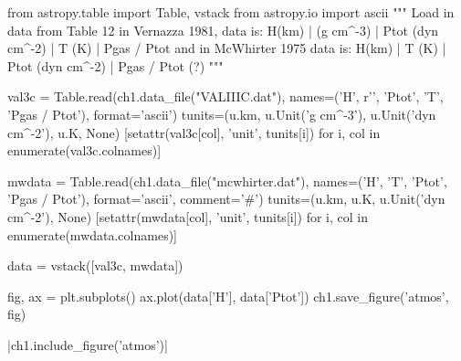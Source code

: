 \begin{pycode}[chapter1]
from astropy.table import Table, vstack
from astropy.io import ascii
"""
Load in data from Table 12 in Vernazza 1981,
data is:
    H(km) | \rho (g cm^-3) | Ptot (dyn cm^-2) | T (K) | Pgas / Ptot
and in McWhirter 1975 data is:  
    H(km) | T (K)          | Ptot (dyn cm^-2) | Pgas / Ptot (?)
"""

val3c = Table.read(ch1.data_file("VALIIIC.dat"),
				  names=('H', r'\rho', 'Ptot', 'T', 'Pgas / Ptot'),
				  format='ascii')
tunits=(u.km, u.Unit('g cm^-3'), u.Unit('dyn cm^-2'), u.K, None)
[setattr(val3c[col], 'unit', tunits[i]) for i, col in enumerate(val3c.colnames)]

mwdata = Table.read(ch1.data_file("mcwhirter.dat"),
				  names=('H', 'T', 'Ptot', 'Pgas / Ptot'),
				  format='ascii', comment='#')
tunits=(u.km, u.K, u.Unit('dyn cm^-2'), None)
[setattr(mwdata[col], 'unit', tunits[i]) for i, col in enumerate(mwdata.colnames)]

data = vstack([val3c, mwdata])

fig, ax = plt.subplots()
ax.plot(data['H'], data['Ptot'])
ch1.save_figure('atmos', fig)
\end{pycode}

\py[chapter1]|ch1.include_figure('atmos')|

